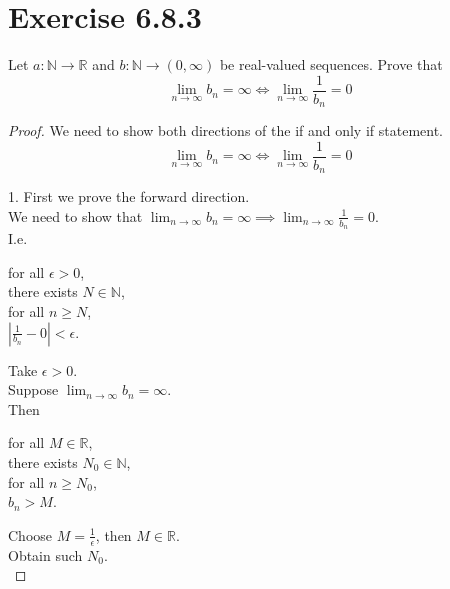 \documentclass{article}
\newcommand{\N}{\mathbb{N}}
\newcommand{\R}{\mathbb{R}}
\newcommand{\e}{\epsilon}
\theoremstyle{mytheoremstyle}
\theoremstyle{mytheoremstyle}
\theoremstyle{myproblemstyle}
\begin{document}
    \section{Exercise 6.8.3}
    \begin{problem}
        Let $a: \N \to \R$ and $b: \N \to (0,\infty)$ be real-valued sequences. Prove that
        $$\lim_{n\to\infty}b_n = \infty \iff \lim_{n\to\infty}\frac{1}{b_n} = 0$$
    \end{problem}
    \begin{proof}
        We need to show both directions of the if and only if statement.
        $$\lim_{n\to\infty}b_n = \infty \iff \lim_{n\to\infty}\frac{1}{b_n} = 0$$

        1. First we prove the forward direction. \\
        We need to show that $\lim_{n\to\infty}b_n = \infty \implies \lim_{n\to\infty}\frac{1}{b_n} = 0$. \\
        I.e.
        \begin{center}
            \parbox{\linewidth}{
                \linewidth
                for all $\e > 0$, \\
                \hspace*{1em} there exists $N \in \N$, \\
                \hspace*{2em} for all $n \geq N$, \\
                \hspace*{3em} $|\frac{1}{b_n} - 0| < \e$.
            }
        \end{center}
        Take $\e > 0$. \\
        Suppose $\lim_{n\to\infty}b_n = \infty$. \\
        Then
        \begin{center}
            \parbox{\linewidth}{
                \linewidth
                for all $M \in \R$, \\
                \hspace*{1em} there exists $N_0 \in \N$, \\
                \hspace*{2em} for all $n \geq N_0$, \\
                \hspace*{3em} $b_n > M$.
            }
        \end{center}
        Choose $M = \frac{1}{\e}$, then $M \in \R$. \\
        Obtain such $N_0$. \\

\end{proof}
\end{document}
